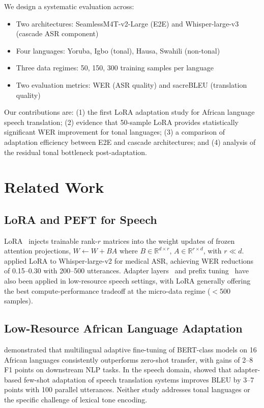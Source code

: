 \documentclass[11pt,a4paper]{article}
\newcommand{\modelSM}{SeamlessM4T-v2-Large}
\begin{document}
We design a systematic evaluation across:
\begin{itemize}
  \item Two architectures: \modelSM{} (E2E) and Whisper-large-v3 (cascade ASR component)
  \item Four languages: Yoruba, Igbo (tonal), Hausa, Swahili (non-tonal)
  \item Three data regimes: 50, 150, 300 training samples per language
  \item Two evaluation metrics: WER (ASR quality) and sacreBLEU (translation quality)
\end{itemize}

Our contributions are: (1) the first LoRA adaptation study for African language speech translation; (2) evidence that 50-sample LoRA provides statistically significant WER improvement for tonal languages; (3) a comparison of adaptation efficiency between E2E and cascade architectures; and (4) analysis of the residual tonal bottleneck post-adaptation.

\section{Related Work}
\label{sec:related}

\subsection{LoRA and PEFT for Speech}
LoRA~\citep{hu2022lora} injects trainable rank-$r$ matrices into the weight updates of frozen attention projections, $W \leftarrow W + BA$ where $B \in \mathbb{R}^{d\times r}$, $A \in \mathbb{R}^{r\times d}$, with $r \ll d$. \citet{majumdar2023lora} applied LoRA to Whisper-large-v2 for medical ASR, achieving WER reductions of 0.15–0.30 with 200–500 utterances. Adapter layers~\citep{houlsby2019adapters} and prefix tuning~\citep{li2021prefix} have also been applied in low-resource speech settings, with LoRA generally offering the best compute-performance tradeoff at the micro-data regime ($<$500 samples).

\subsection{Low-Resource African Language Adaptation}
\citet{alabi2022adapting} demonstrated that multilingual adaptive fine-tuning of BERT-class models on 16 African languages consistently outperforms zero-shot transfer, with gains of 2–8 F1 points on downstream NLP tasks. In the speech domain, \citet{gris2022fewshot} showed that adapter-based few-shot adaptation of speech translation systems improves BLEU by 3–7 points with 100 parallel utterances. Neither study addresses tonal languages or the specific challenge of lexical tone encoding.
\end{document}
